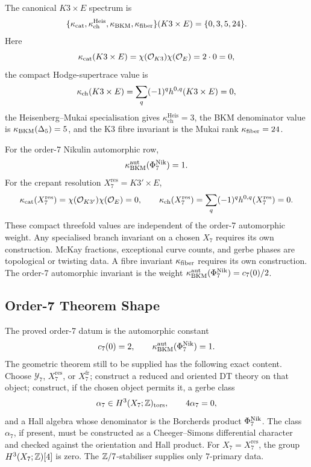 The canonical \(K3\times E\) spectrum is
\[
 \{\kappa_{\mathrm{cat}},\kappa_{\mathrm{ch}}^{\mathrm{Heis}},
 \kappa_{\mathrm{BKM}},\kappa_{\mathrm{fiber}}\}(K3\times E)
 =
 \{0,3,5,24\}.
\]
Here
\[
  \kappa_{\mathrm{cat}}(K3\times E)=
  \chi(\mathcal{O}_{K3})\chi(\mathcal{O}_E)=2\cdot0=0,
\]
the compact Hodge-supertrace value is
\[
  \kappa_{\mathrm{ch}}(K3\times E)=
  \sum_q(-1)^q h^{0,q}(K3\times E)=0,
\]
the Heisenberg--Mukai specialisation gives
\(\kappa_{\mathrm{ch}}^{\mathrm{Heis}}=3\), the BKM denominator
value is \(\kappa_{\mathrm{BKM}}(\Delta_{5})=5\), and the K3 fibre invariant is the Mukai
rank \(\kappa_{\mathrm{fiber}}=24\).

For the order-7 Nikulin automorphic row,
\[
  \kappa_{\mathrm{BKM}}^{\mathrm{aut}}(\Phi_{7}^{\mathrm{Nik}})=1.
\]
For the crepant resolution \(X_7^{\mathrm{res}}=K3'\times E\),
\[
  \kappa_{\mathrm{cat}}(X_7^{\mathrm{res}})=
  \chi(\mathcal{O}_{K3'})\chi(\mathcal{O}_E)=0,\qquad
  \kappa_{\mathrm{ch}}(X_7^{\mathrm{res}})=
  \sum_q(-1)^q h^{0,q}(X_7^{\mathrm{res}})=0 .
\]
These compact threefold values are independent of the order-7
automorphic weight.  Any specialised branch invariant on a chosen
\(X_7\) requires its own construction.  McKay fractions, exceptional
curve counts, and gerbe phases are topological or twisting data.  A fibre invariant
\(\kappa_{\mathrm{fiber}}\) requires its own construction.  The order-7 automorphic
invariant is the weight \(\kappa_{\mathrm{BKM}}^{\mathrm{aut}}(\Phi_{7}^{\mathrm{Nik}})=c_7(0)/2\).

\subsection*{Order-7 Theorem Shape}

The proved order-7 datum is the automorphic constant
\[
  c_7(0)=2,\qquad \kappa_{\mathrm{BKM}}^{\mathrm{aut}}(\Phi_{7}^{\mathrm{Nik}})=1.
\]
The geometric theorem still to be supplied has the following exact
content.  Choose \(\mathcal Y_7\), \(X_7^{\mathrm{res}}\), or
\(X_7^{\mathrm{fr}}\); construct a reduced and oriented DT theory on
that object; construct, if the chosen object permits it, a gerbe class
\[
  \alpha_7\in H^3(X_7;\mathbb{Z})_{\mathrm{tors}},\qquad 4\alpha_7=0,
\]
and a Hall algebra whose denominator is the Borcherds product
\(\Phi_{7}^{\mathrm{Nik}}\).  The class \(\alpha_7\), if present, must be constructed
as a Cheeger--Simons differential character and checked against the
orientation and Hall product.  For \(X_7=X_7^{\mathrm{res}}\), the
group \(H^3(X_7;\mathbb{Z})[4]\) is zero.  The \(\mathbb{Z}/7\)-stabiliser supplies
only \(7\)-primary data.

